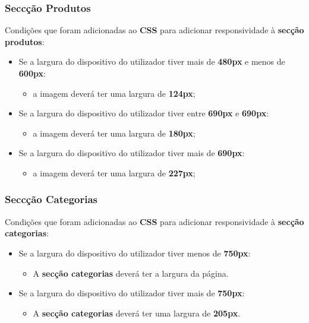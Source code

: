 \documentclass[11pt]{article}   %
\begin{document}
\subsubsection{Seccção Produtos}
Condições que foram adicionadas ao \textbf{CSS} para adicionar responsividade à \textbf{secção produtos}:
\begin{itemize}
    \item Se a largura do dispositivo do utilizador tiver mais de \textbf{480px} e menos de \textbf{600px}: 
    \begin{itemize}
        \item a imagem deverá ter uma largura de \textbf{124px};
    \end{itemize}
    \item Se a largura do dispositivo do utilizador tiver entre \textbf{690px} e \textbf{690px}:
    \begin{itemize}
        \item a imagem deverá ter uma largura de \textbf{180px};
    \end{itemize}
    \item Se a largura do dispositivo do utilizador tiver mais de \textbf{690px}:
    \begin{itemize}
        \item a imagem deverá ter uma largura de \textbf{227px};
    \end{itemize}
\end{itemize}

\subsubsection{Seccção Categorias}
Condições que foram adicionadas ao \textbf{CSS} para adicionar responsividade à \textbf{secção categorias}:
\begin{itemize}
    \item Se a largura do dispositivo do utilizador tiver menos de \textbf{750px}:
    \begin{itemize}
        \item A \textbf{secção categorias} deverá ter a largura da página.
    \end{itemize}
    \item Se a largura do dispositivo do utilizador tiver mais de \textbf{750px}:
    \begin{itemize}
        \item A \textbf{secção categorias} deverá ter uma largura de \textbf{205px}.
    \end{itemize} 
\end{itemize}
\end{document}
